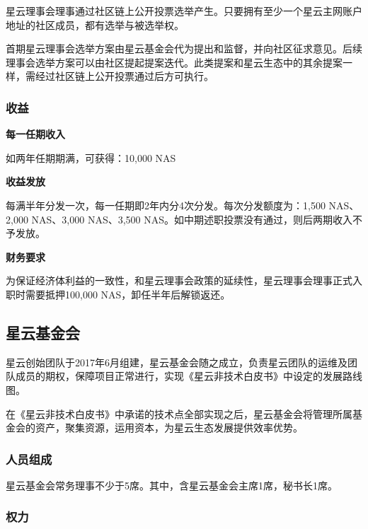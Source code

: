 星云理事会理事通过社区链上公开投票选举产生。只要拥有至少一个星云主网账户地址的社区成员，都有选举与被选举权。

首期星云理事会选举方案由星云基金会代为提出和监督，并向社区征求意见。后续理事会选举方案可以由社区提起提案迭代。此类提案和星云生态中的其余提案一样，需经过社区链上公开投票通过后方可执行。


\subsubsection{收益}

\textbf{每一任期收入}

如两年任期期满，可获得：10,000 NAS

\vspace{2em}

\textbf{收益发放}

每满半年分发一次，每一任期即2年内分4次分发。每次分发额度为：1,500 NAS、2,000 NAS、3,000 NAS、3,500 NAS。如中期述职投票没有通过，则后两期收入不予发放。

\vspace{2em}

\textbf{财务要求}

为保证经济体利益的一致性，和星云理事会政策的延续性，星云理事会理事正式入职时需要抵押100,000 NAS，卸任半年后解锁返还。

\vspace{2em}

\subsection{星云基金会}

星云创始团队于2017年6月组建，星云基金会随之成立，负责星云团队的运维及团队成员的期权，保障项目正常进行，实现《星云非技术白皮书》中设定的发展路线图。

在《星云非技术白皮书》中承诺的技术点全部实现之后，星云基金会将管理所属基金会的资产，聚集资源，运用资本，为星云生态发展提供效率优势。

\subsubsection{人员组成}

星云基金会常务理事不少于5席。其中，含星云基金会主席1席，秘书长1席。

\subsubsection{权力}

